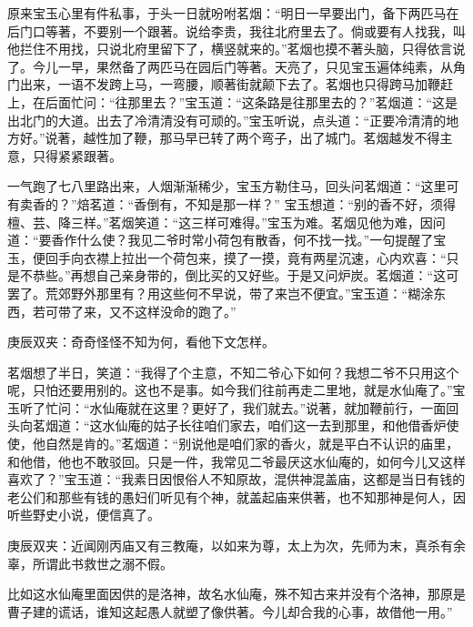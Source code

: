 \begin{parag}
    原来宝玉心里有件私事，于头一日就吩咐茗烟：“明日一早要出门，备下两匹马在后门口等著，不要别一个跟著。说给李贵，我往北府里去了。倘或要有人找我，叫他拦住不用找，只说北府里留下了，横竖就来的。”茗烟也摸不著头脑，只得依言说了。今儿一早，果然备了两匹马在园后门等著。天亮了，只见宝玉遍体纯素，从角门出来，一语不发跨上马，一弯腰，顺著街就颠下去了。茗烟也只得跨马加鞭赶上，在后面忙问：“往那里去？”宝玉道：“这条路是往那里去的？”茗烟道：“这是出北门的大道。出去了冷清清没有可顽的。”宝玉听说，点头道：“正要冷清清的地方好。”说著，越性加了鞭，那马早已转了两个弯子，出了城门。茗烟越发不得主意，只得紧紧跟著。
\end{parag}


\begin{parag}
    一气跑了七八里路出来，人烟渐渐稀少，宝玉方勒住马，回头问茗烟道：“这里可有卖香的？”焙茗道：“香倒有，不知是那一样？” 宝玉想道：“别的香不好，须得檀、芸、降三样。”茗烟笑道：“这三样可难得。”宝玉为难。茗烟见他为难，因问道：“要香作什么使？我见二爷时常小荷包有散香，何不找一找。”一句提醒了宝玉，便回手向衣襟上拉出一个荷包来，摸了一摸，竟有两星沉速，心内欢喜：“只是不恭些。”再想自己亲身带的，倒比买的又好些。于是又问炉炭。茗烟道：“这可罢了。荒郊野外那里有？用这些何不早说，带了来岂不便宜。”宝玉道：“糊涂东西，若可带了来，又不这样没命的跑了。”\begin{note}庚辰双夹：奇奇怪怪不知为何，看他下文怎样。\end{note}茗烟想了半日，笑道：“我得了个主意，不知二爷心下如何？我想二爷不只用这个呢，只怕还要用别的。这也不是事。如今我们往前再走二里地，就是水仙庵了。”宝玉听了忙问：“水仙庵就在这里？更好了，我们就去。”说著，就加鞭前行，一面回头向茗烟道：“这水仙庵的姑子长往咱们家去，咱们这一去到那里，和他借香炉使使，他自然是肯的。”茗烟道：“别说他是咱们家的香火，就是平白不认识的庙里，和他借，他也不敢驳回。只是一件，我常见二爷最厌这水仙庵的，如何今儿又这样喜欢了？”宝玉道：“我素日因恨俗人不知原故，混供神混盖庙，这都是当日有钱的老公们和那些有钱的愚妇们听见有个神，就盖起庙来供著，也不知那神是何人，因听些野史小说，便信真了。\begin{note}庚辰双夹：近闻刚丙庙又有三教庵，以如来为尊，太上为次，先师为末，真杀有余辜，所谓此书救世之溺不假。\end{note}比如这水仙庵里面因供的是洛神，故名水仙庵，殊不知古来并没有个洛神，那原是曹子建的谎话，谁知这起愚人就塑了像供著。今儿却合我的心事，故借他一用。”
\end{parag}


